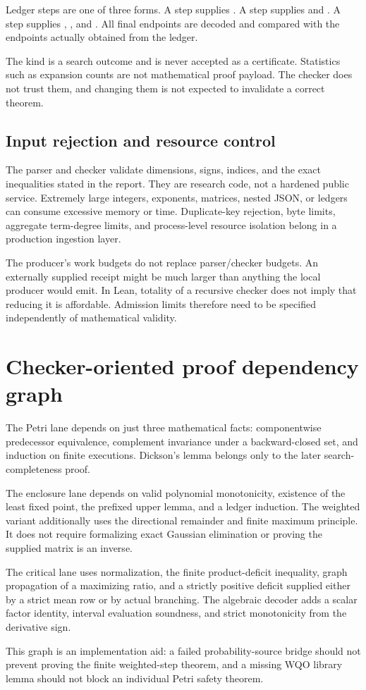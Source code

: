 Ledger steps are one of three forms. A  step supplies . A  step supplies  and . A  step supplies , , and . All final endpoints are decoded and compared with the endpoints actually obtained from the ledger.

The  kind is a search outcome and is never accepted as a certificate. Statistics such as expansion counts are not mathematical proof payload. The checker does not trust them, and changing them is not expected to invalidate a correct theorem.

\subsection{Input rejection and resource control}
The parser and checker validate dimensions, signs, indices, and the exact inequalities stated in the report. They are research code, not a hardened public service. Extremely large integers, exponents, matrices, nested JSON, or ledgers can consume excessive memory or time. Duplicate-key rejection, byte limits, aggregate term-degree limits, and process-level resource isolation belong in a production ingestion layer.

The producer's work budgets do not replace parser/checker budgets. An externally supplied receipt might be much larger than anything the local producer would emit. In Lean, totality of a recursive checker does not imply that reducing it is affordable. Admission limits therefore need to be specified independently of mathematical validity.

\section{Checker-oriented proof dependency graph}
The Petri lane depends on just three mathematical facts: componentwise predecessor equivalence, complement invariance under a backward-closed set, and induction on finite executions. Dickson's lemma belongs only to the later search-completeness proof.

The enclosure lane depends on valid polynomial monotonicity, existence of the least fixed point, the prefixed upper lemma, and a ledger induction. The weighted variant additionally uses the directional remainder and finite maximum principle. It does not require formalizing exact Gaussian elimination or proving the supplied matrix is an inverse.

The critical lane uses normalization, the finite product-deficit inequality, graph propagation of a maximizing ratio, and a strictly positive deficit supplied either by a strict mean row or by actual branching. The algebraic decoder adds a scalar factor identity, interval evaluation soundness, and strict monotonicity from the derivative sign.

This graph is an implementation aid: a failed probability-source bridge should not prevent proving the finite weighted-step theorem, and a missing WQO library lemma should not block an individual Petri safety theorem.
